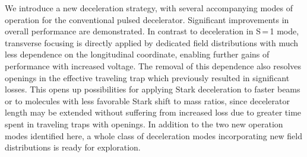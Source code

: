 \documentclass[%
 reprint,
 amsmath,amssymb,
 aps,
prl,
]{revtex4-1}
\begin{document}
We introduce a new deceleration strategy, with several accompanying modes of operation for the conventional pulsed decelerator. 
Significant improvements in overall performance are demonstrated.
In contrast to deceleration in S\,=\,1 mode, transverse focusing is directly applied by dedicated field distributions with much less dependence on the longitudinal coordinate, enabling further gains of performance with increased voltage.
The removal of this dependence also resolves openings in the effective traveling trap which previously resulted in significant losses.
This opens up possibilities for applying Stark deceleration to faster beams or to molecules with less favorable Stark shift to mass ratios, since decelerator length may be extended without suffering from increased loss due to greater time spent in traveling traps with openings.
In addition to the two new operation modes identified here, a whole class of deceleration modes incorporating new field distributions is ready for exploration.





\end{document}
